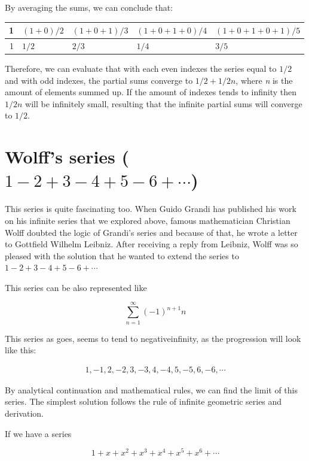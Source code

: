 \documentclass[a4paper]{article}
\begin{document}
By averaging the sums, we can conclude that:

\begin{center}
\begin{tabular}{rllll}
1 & \((1+0)/2\) & \((1+0+1)/3\) & \((1+0+1+0)/4\) & \((1+0+1+0+1)/5\)\\
\hline
1 & \(1/2\) & \(2/3\) & \(1/4\) & \(3/5\)\\
\end{tabular}
\end{center}

Therefore, we can evaluate that with each even indexes the series equal to \(1/2\)
and with odd indexes, the partial sums converge to \(1/2+1/2n\), where \emph{n} is the
amount of elements summed up. If the amount of indexes tends to infinity then
\(1/2n\) will be infinitely small, resulting that the infinite partial sums will
converge to \(1/2\). 

\section{Wolff's series (\(1-2+3-4+5-6+\cdots\))}
\label{sec:org8d323be}

This series is quite fascinating too. When Guido Grandi has published his work
on his infinite series that we explored above, famous mathematician Christian
Wolff doubted the logic of Grandi's series and because of that, he wrote a
letter to Gottfield Wilhelm Leibniz. After receiving a reply \cite{Wolff} from
Leibniz, Wolff was so pleased with the solution that he wanted to extend the
series to \(1-2+3-4+5-6+\cdots\) 

This series can be also represented like

\begin{equation*}
\sum_{n=1}^\infty (-1)^{n+1}n 
\end{equation*}

This series as goes, seems to tend to negativeinfinity, as the
progression will look like this: 

\begin{align*}
1, -1, 2, -2, 3, -3, 4, -4, 5, -5, 6, -6, \cdots
\end{align*}

By analytical continuation and mathematical rules, we can find the limit of this
series. The simplest solution follows the rule of infinite geometric series and
derivation. 

If we have a series

\begin{equation*}
1+x+x^2+x^3+x^4+x^5+x^6+\cdots
\end{equation*}
\end{document}
